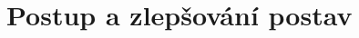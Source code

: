 \documentclass[../main.tex]{subfiles}
\begin{document}
\chapter{Postup a zlepšování postav}
\label{chap:postup}
\end{document}
